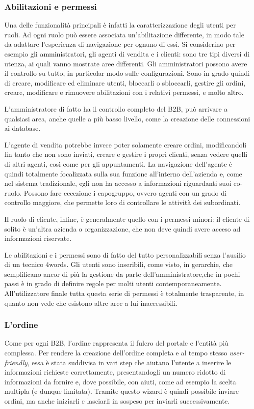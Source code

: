 \subsubsection{Abilitazioni e permessi}
Una delle funzionalità principali è infatti la caratterizzazione degli utenti per ruoli. Ad ogni ruolo può essere associata un'abilitazione differente, in modo tale da adattare l'esperienza di navigazione per ognuno di essi. Si considerino per esempio gli amministratori, gli agenti di vendita e i clienti: sono tre tipi diversi di utenza, ai quali vanno mostrate aree differenti. Gli amministratori possono avere il controllo su tutto, in particolar modo sulle configurazioni. Sono in grado quindi di creare, modificare ed eliminare utenti, bloccarli o sbloccarli, gestire gli ordini, creare, modificare e rimuovere abilitazioni con i relativi permessi, e molto altro.

L'amministratore di fatto ha il controllo completo del B2B, può arrivare a qualsiasi area, anche quelle a più basso livello, come la creazione delle connessioni ai database.

L'agente di vendita potrebbe invece poter solamente creare ordini, modificandoli fin tanto che non sono inviati, creare e gestire i propri clienti, senza vedere quelli di altri agenti, così come per gli appuntamenti. La navigazione dell'agente è quindi totalmente focalizzata sulla sua funzione all'interno dell'azienda e, come nel sistema tradizionale, egli non ha accesso a informazioni riguardanti suoi co-ruolo. Possono fare eccezione i capogruppo, ovvero agenti con un grado di controllo maggiore, che permette loro di controllare le attività dei subordinati.

Il ruolo di cliente, infine, è generalmente quello con i permessi minori: il cliente di solito è un'altra azienda o organizzazione, che non deve quindi avere acceso ad informazioni riservate.

Le abilitazioni e i permessi sono di fatto del tutto personalizzabili senza l'ausilio di un tecnico 4words. Gli utenti sono inseribili, come visto, in gerarchie, che semplificano ancor di più la gestione da parte dell'amministratore,che in pochi passi è in grado di definire regole per molti utenti contemporaneamente. All'utilizzatore finale tutta questa serie di permessi è totalmente trasparente, in quanto non vede che esistono altre aree a lui inaccessibili.

\subsubsection{L'ordine}
Come per ogni B2B, l'ordine rappresenta il fulcro del portale e l'entità più complessa. Per rendere la creazione dell'ordine completa e al tempo stesso \textit{user-friendly}, essa è stata suddivisa in vari step che aiutano l'utente a inserire le informazioni richieste correttamente, presentandogli un numero ridotto di informazioni da fornire e, dove possibile, con aiuti, come ad esempio la scelta multipla (e dunque limitata). Tramite questo \gls{wizard} è quindi possibile inviare ordini, ma anche iniziarli e lasciarli in sospeso per inviarli successivamente.

